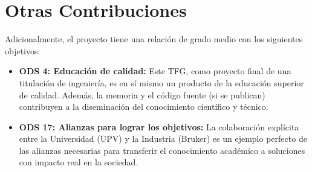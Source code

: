 \section{Otras Contribuciones}
\label{sec:ods_otras}

Adicionalmente, el proyecto tiene una relación de grado medio con los siguientes objetivos:

\begin{itemize}
    \item \textbf{ODS 4: Educación de calidad:} Este TFG, como proyecto final de una titulación de ingeniería, es en sí mismo un producto de la educación superior de calidad. Además, la memoria y el código fuente (si se publican) contribuyen a la diseminación del conocimiento científico y técnico.
    \item \textbf{ODS 17: Alianzas para lograr los objetivos:} La colaboración explícita entre la Universidad (UPV) y la Industria (Bruker) es un ejemplo perfecto de las alianzas necesarias para transferir el conocimiento académico a soluciones con impacto real en la sociedad.
\end{itemize}